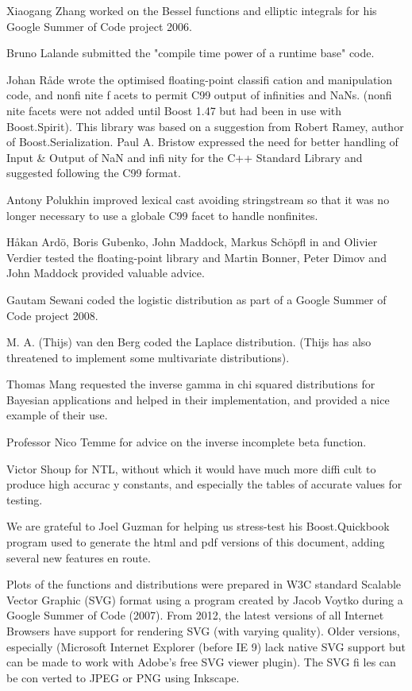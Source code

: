 \vpara
Xiaogang Zhang worked on the Bessel functions and elliptic integrals for his Google Summer of Code project 2006.

\vpara
Bruno Lalande submitted the "compile time power of a runtime base" code.

\vpara
Johan Råde wrote the optimised floating-point classifi cation and manipulation code, and nonfi nite f acets to permit C99 output of infinities and NaNs. (nonfi nite facets were not added until Boost 1.47 but had been in use with Boost.Spirit). This library was based on a suggestion from Robert Ramey, author of Boost.Serialization. Paul A. Bristow expressed the need for better handling of Input \& Output of NaN and infi nity for the C++ Standard Library  and suggested following the C99 format.

\vpara
Antony Polukhin improved lexical cast avoiding stringstream so that it was no longer necessary to use a globale C99 facet to handle nonfinites.

\vpara
Håkan Ardö, Boris Gubenko, John Maddock, Markus Schöpfl in and Olivier Verdier tested the floating-point library and Martin Bonner, Peter Dimov and John Maddock provided valuable advice.

\vpara
Gautam Sewani coded the logistic distribution as part of a Google Summer of Code project 2008.

\vpara
M. A. (Thijs) van den Berg coded the Laplace distribution. (Thijs has also threatened to implement some multivariate distributions).

\vpara
Thomas Mang requested the inverse gamma in chi squared distributions for Bayesian applications and helped in their implementation, and provided a nice example of their use.

\vpara
Professor Nico Temme for advice on the inverse incomplete beta function.

\vpara
Victor Shoup for NTL, without which it would have much more diffi cult to produce high accurac y constants, and especially the tables of accurate values for testing.

\vpara
We are grateful to Joel Guzman for helping us stress-test his Boost.Quickbook program used to generate the html and pdf versions of this document, adding several new features en route.

\vpara
Plots of the functions and distributions were prepared in W3C standard Scalable Vector Graphic (SVG) format using a program created by Jacob Voytko during a Google Summer of Code (2007). From 2012, the latest versions of all Internet Browsers have support for rendering SVG (with varying quality). Older versions, especially (Microsoft Internet Explorer (before IE 9) lack native SVG support but can be made to work with Adobe's free SVG viewer plugin). The SVG fi les can be con verted to JPEG or PNG using Inkscape.


